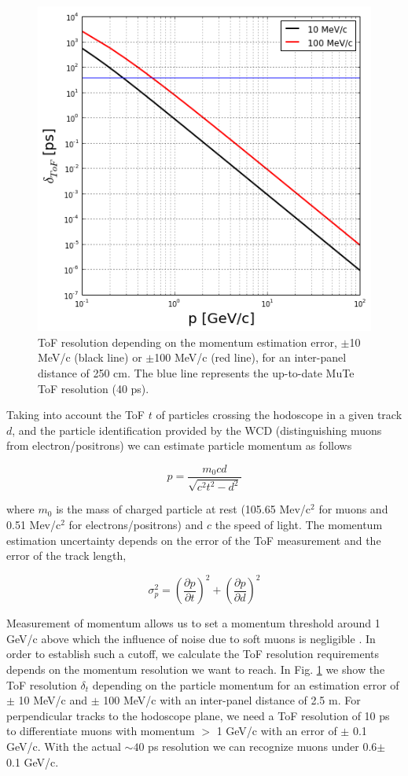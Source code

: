 \documentclass[letterpaper,11pt]{article}
\begin{document}
\begin{figure}[htb]
\centering
\includegraphics[width=0.5\columnwidth]{Figures/ToF_Resolution_250cm.png}
\caption{ToF resolution depending on the momentum estimation error, $\pm$10 MeV/c (black line) or $\pm$100 MeV/c (red line), for an inter-panel distance of 250 cm. The blue line represents the up-to-date MuTe ToF resolution (40 ps).}
\label{fig:ToF_Resolution}
\end{figure}

Taking into account the ToF $t$ of particles crossing the hodoscope in a given track $d$, and the particle identification provided by the WCD (distinguishing muons from electron/positrons) we can estimate particle momentum as follows

\begin{equation}
p = \frac{m_0 c d}{\sqrt{c^2t^2-d^2}}
\end{equation}

where $m_0$ is the mass of charged particle at rest (105.65 Mev/c$^2$ for muons and 0.51 Mev/c$^2$ for electrons/positrons) and $c$ the speed of light. The momentum estimation uncertainty depends on the error of the ToF measurement and the error of the track length,

\begin{equation}
\sigma_p^2 = \left( \frac{\partial p}{\partial t} \right)^2 + \left( \frac{\partial p}{\partial d} \right)^2
\end{equation}

Measurement of momentum allows us to set a momentum threshold around 1 GeV/c above which the influence of noise due to soft muons is negligible \cite{nishiyama2016monte, nishiyama2014experimental, Olh2018, Olh2017, ambrosino2015joint}. In order to establish such a cutoff, we calculate the ToF resolution requirements depends on the momentum resolution we want to reach. In Fig. \ref{fig:ToF_Resolution} we show the ToF resolution $\delta_t$ depending on the particle momentum for an estimation error of $\pm$ 10 MeV/c and $\pm$ 100 MeV/c with an inter-panel distance of 2.5 m. For perpendicular tracks to the hodoscope plane, we need a ToF resolution of 10 ps to differentiate muons with momentum $>$ 1 GeV/c with an error of $\pm$ 0.1 GeV/c. With the actual $\sim 40$ ps resolution we can recognize muons under 0.6$\pm$ 0.1 GeV/c.
\end{document}
